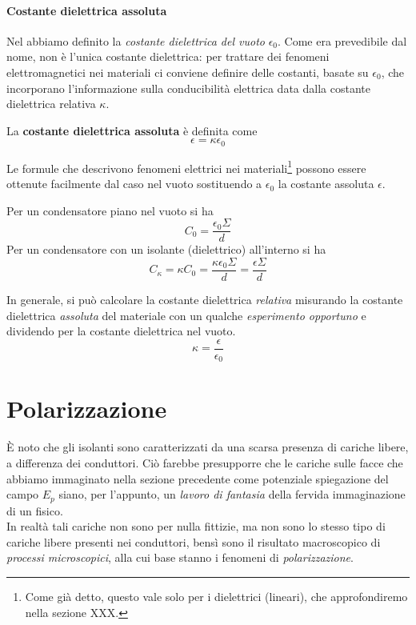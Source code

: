 \paragraph{Costante dielettrica assoluta}
Nel  abbiamo definito la \textit{costante dielettrica del vuoto} $\epsilon_0$. Come era prevedibile dal nome, non è l'unica costante dielettrica: per trattare dei fenomeni elettromagnetici nei materiali ci conviene definire delle costanti, basate su $\epsilon_0$, che incorporano l'informazione sulla conducibilità elettrica data dalla costante dielettrica relativa $\kappa$.
\begin{define}
	La \textbf{costante dielettrica assoluta} è definita come
	\begin{equation}
		\epsilon=\kappa\epsilon_0
	\end{equation}
\end{define}
Le formule che descrivono fenomeni elettrici nei materiali\footnote{Come già detto, questo vale solo per i dielettrici (lineari), che approfondiremo nella sezione XXX.} possono essere ottenute facilmente dal caso nel vuoto sostituendo a $\epsilon_0$ la costante assoluta $\epsilon$.
\begin{example}
	Per un condensatore piano nel vuoto si ha
	\begin{equation*}
		C_0=\frac{\epsilon_0\Sigma}{d}
	\end{equation*}
	Per un condensatore con un isolante (dielettrico) all'interno si ha
	\begin{equation*}
		C_{\kappa}=\kappa C_0=\frac{\kappa\epsilon_0\Sigma}{d}=\frac{\epsilon\Sigma}{d}
	\end{equation*}
\end{example}
\begin{observe}
	In generale, si può calcolare la costante dielettrica \textit{relativa} misurando la costante dielettrica \textit{assoluta} del materiale con un qualche \textit{esperimento opportuno} e dividendo per la costante dielettrica nel vuoto.
	\begin{equation}
		\kappa=\frac{\epsilon}{\epsilon_0}
	\end{equation}
\end{observe}
\section{Polarizzazione}
È noto che gli isolanti sono caratterizzati da una scarsa presenza di cariche libere, a differenza dei conduttori. Ciò farebbe presupporre che le cariche sulle facce che abbiamo immaginato nella sezione precedente come potenziale spiegazione del campo $E_p$ siano, per l'appunto, un \textit{lavoro di fantasia} della fervida immaginazione di un fisico.\\
In realtà tali cariche non sono per nulla fittizie, ma non sono lo stesso tipo di cariche libere presenti nei conduttori, bensì sono il risultato macroscopico di \textit{processi microscopici}, alla cui base stanno i fenomeni di \textit{polarizzazione}.

